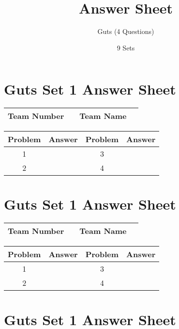 \documentclass[14pt]{article}
\title{Answer Sheet}
\author{Guts (4 Questions)}
\date{9 Sets}
\begin{document}
\section*{Guts Set 1 Answer Sheet}

\begin{center}
\begin{tabular}{|r|r|r|r|}
\hline
	Team Number & \hspace{10em} &
	Team Name & \hspace{15em} \\ \hline
\end{tabular}
\end{center}
\begin{tabularx}{\textwidth}{|c|l|c|X|}\hline
	Problem & Answer & Problem & Answer \\\hline
	1 & \hspace{15em} & 3 & \\\hline
	2 & & 4 & \\\hline
\end{tabularx}

\vspace{30px}

\section*{Guts Set 1 Answer Sheet}

\begin{center}
\begin{tabular}{|r|r|r|r|}
\hline
	Team Number & \hspace{10em} &
	Team Name & \hspace{15em} \\ \hline
\end{tabular}
\end{center}
\begin{tabularx}{\textwidth}{|c|l|c|X|}\hline
	Problem & Answer & Problem & Answer \\\hline
	1 & \hspace{15em} & 3 & \\\hline
	2 & & 4 & \\\hline
\end{tabularx}

\vspace{30px}

\section*{Guts Set 1 Answer Sheet}
\end{document}
